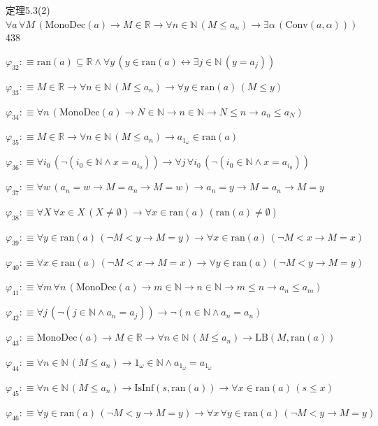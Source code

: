\begin{fullproof}{定理5.3(2)}{$\forall a\,\forall M\,(\mathrm{MonoDec}(a) \to M \in \mathbb{R} \to \forall n \in \mathbb{N}\,(M \leq a_{n}) \to \exists \alpha\,(\mathrm{Conv}(a,\alpha)))$}{438}
\begin{abbrevlist}
\item $\varphi_{32} :\equiv \mathrm{ran}(a) \subseteq \mathbb{R} \land \forall y\,(y \in \mathrm{ran}(a) \leftrightarrow \exists j \in \mathbb{N}\,(y = a_{j}))$
\item $\varphi_{33} :\equiv M \in \mathbb{R} \to \forall n \in \mathbb{N}\,(M \leq a_{n}) \to \forall y \in \mathrm{ran}(a)\,(M \leq y)$
\item $\varphi_{34} :\equiv \forall n\,(\mathrm{MonoDec}(a) \to N \in \mathbb{N} \to n \in \mathbb{N} \to N \leq n \to a_{n} \leq a_{N})$
\item $\varphi_{35} :\equiv M \in \mathbb{R} \to \forall n \in \mathbb{N}\,(M \leq a_{n}) \to a_{1_{\omega}} \in \mathrm{ran}(a)$
\item $\varphi_{36} :\equiv \forall i_{0}\,(\neg (i_{0} \in \mathbb{N} \land x = a_{i_{0}})) \to \forall j\,\forall i_{0}\,(\neg (i_{0} \in \mathbb{N} \land x = a_{i_{0}}))$
\item $\varphi_{37} :\equiv \forall w\,(a_{n} = w \to M = a_{n} \to M = w) \to a_{n} = y \to M = a_{n} \to M = y$
\item $\varphi_{38} :\equiv \forall X\,\forall x \in X\,(X \neq \emptyset) \to \forall x \in \mathrm{ran}(a)\,(\mathrm{ran}(a) \neq \emptyset)$
\item $\varphi_{39} :\equiv \forall y \in \mathrm{ran}(a)\,(\neg M < y \to M = y) \to \forall x \in \mathrm{ran}(a)\,(\neg M < x \to M = x)$
\item $\varphi_{40} :\equiv \forall x \in \mathrm{ran}(a)\,(\neg M < x \to M = x) \to \forall y \in \mathrm{ran}(a)\,(\neg M < y \to M = y)$
\item $\varphi_{41} :\equiv \forall m\,\forall n\,(\mathrm{MonoDec}(a) \to m \in \mathbb{N} \to n \in \mathbb{N} \to m \leq n \to a_{n} \leq a_{m})$
\item $\varphi_{42} :\equiv \forall j\,(\neg (j \in \mathbb{N} \land a_{n} = a_{j})) \to \neg (n \in \mathbb{N} \land a_{n} = a_{n})$
\item $\varphi_{43} :\equiv \mathrm{MonoDec}(a) \to M \in \mathbb{R} \to \forall n \in \mathbb{N}\,(M \leq a_{n}) \to \mathrm{LB}(M,\mathrm{ran}(a))$
\item $\varphi_{44} :\equiv \forall n \in \mathbb{N}\,(M \leq a_{n}) \to 1_{\omega} \in \mathbb{N} \land a_{1_{\omega}} = a_{1_{\omega}}$
\item $\varphi_{45} :\equiv \forall n \in \mathbb{N}\,(M \leq a_{n}) \to \mathrm{IsInf}(s,\mathrm{ran}(a)) \to \forall x \in \mathrm{ran}(a)\,(s \leq x)$
\item $\varphi_{46} :\equiv \forall y \in \mathrm{ran}(a)\,(\neg M < y \to M = y) \to \forall x\,\forall y \in \mathrm{ran}(a)\,(\neg M < y \to M = y)$

\end{abbrevlist}
\end{fullproof}
